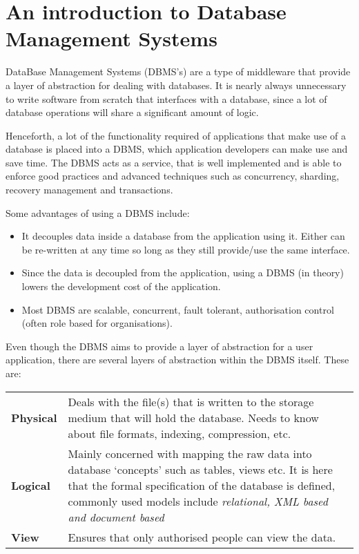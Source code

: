
\section{An introduction to Database Management Systems}

DataBase Management Systems (DBMS's) are a type of middleware that provide a
layer of abstraction for dealing with databases. It is nearly always unnecessary
to write software from scratch that interfaces with a database, since a lot of
database operations will share a significant amount of logic.

Henceforth, a lot of the functionality required of applications that make use of
a database is placed into a DBMS, which application developers can make use and
save time. The DBMS acts as a service, that is well implemented and is able to
enforce good practices and advanced techniques such as concurrency, sharding,
recovery management and transactions.

Some advantages of using a DBMS include:

\begin{itemize}
  \item It decouples data inside a database from the application using it.
        Either can be re-written at any time so long as they still provide/use
        the same interface.
  \item Since the data is decoupled from the application, using a DBMS (in
        theory) lowers the development cost of the application.
  \item Most DBMS are scalable, concurrent, fault tolerant, authorisation
        control (often role based for organisations).
\end{itemize}

Even though the DBMS aims to provide a layer of abstraction for a user
application, there are several layers of abstraction within the DBMS itself.
These are:

\begin{tabularx}{\textwidth}{>{\bfseries}l X}
  Physical & Deals with the file(s) that is written to the
             storage medium that will hold the database. Needs to know about
             file formats, indexing, compression, etc.\\
  Logical  & Mainly concerned with mapping the raw data into database
             `concepts' such as tables, views etc. It is here that the formal
             specification of the database is defined, commonly used models
             include \textit{relational, XML based and document based}\\
  View     & Ensures that only authorised people can view the data.\\
\end{tabularx}

